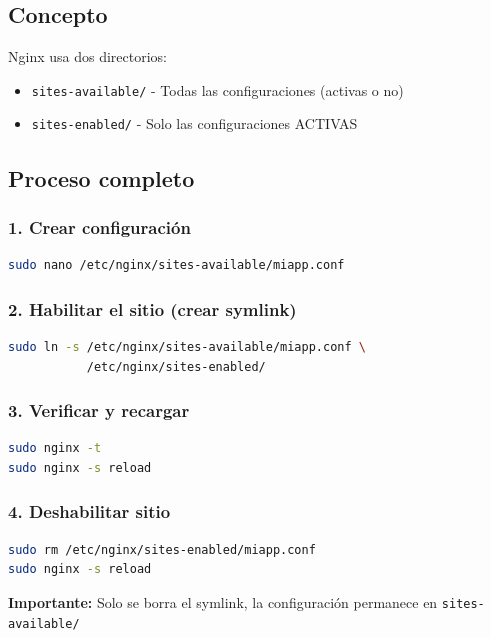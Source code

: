 \documentclass[11pt,a4paper]{article}
\begin{document}
\subsection{Concepto}

Nginx usa dos directorios:
\begin{itemize}
    \item \texttt{sites-available/} - Todas las configuraciones (activas o no)
    \item \texttt{sites-enabled/} - Solo las configuraciones ACTIVAS
\end{itemize}

\subsection{Proceso completo}

\subsubsection{1. Crear configuración}
\begin{lstlisting}[language=bash]
sudo nano /etc/nginx/sites-available/miapp.conf
\end{lstlisting}

\subsubsection{2. Habilitar el sitio (crear symlink)}
\begin{lstlisting}[language=bash]
sudo ln -s /etc/nginx/sites-available/miapp.conf \
           /etc/nginx/sites-enabled/
\end{lstlisting}

\subsubsection{3. Verificar y recargar}
\begin{lstlisting}[language=bash]
sudo nginx -t
sudo nginx -s reload
\end{lstlisting}

\subsubsection{4. Deshabilitar sitio}
\begin{lstlisting}[language=bash]
sudo rm /etc/nginx/sites-enabled/miapp.conf
sudo nginx -s reload
\end{lstlisting}

\textbf{Importante:} Solo se borra el symlink, la configuración permanece en \texttt{sites-available/}
\end{document}
